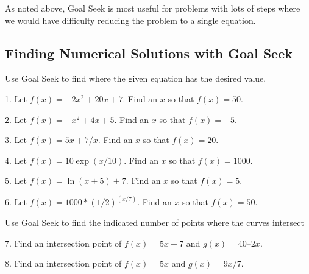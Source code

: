 \documentclass[10pt,]{book}
\theoremstyle{plain}
\theoremstyle{definition}
\theoremstyle{definition}
\begin{document}
%
\par

As noted above, Goal Seek is most useful for problems with lots of steps where we would have difficulty reducing the problem to a single equation.%
\typeout{************************************************}
\typeout{************************************************}
\subsection[{ Finding Numerical Solutions with Goal Seek}]{ Finding Numerical Solutions with Goal Seek}\label{exercises-set-sec-1-6}

Use Goal Seek to find where the given equation has the desired value.%
\begin{exerciselist}
\item[1.]\hypertarget{exercise-75}{} Let \(f(x) = -2 x^2 + 20 x + 7\).  Find an \(x\) so that \(f(x) = 50\).
%
\par\smallskip
\item[2.]\hypertarget{exercise-76}{} Let \(f(x) = -x^2 + 4 x + 5\).  Find an \(x\) so that \(f(x) = -5\).
%
\par\smallskip
\item[3.]\hypertarget{exercise-77}{} Let \(f(x) = 5 x + 7/x\).  Find an \(x\) so that \(f(x) = 20\).
%
\par\smallskip
\item[4.]\hypertarget{exercise-78}{} Let \(f(x) = 10 \exp(x/10)\).  Find an \(x\) so that \(f(x) = 1000\).
%
\par\smallskip
\item[5.]\hypertarget{exercise-79}{} Let \(f(x) = \ln(x+5) + 7\).  Find an \(x\) so that \(f(x) = 5\).
%
\par\smallskip
\item[6.]\hypertarget{exercise-80}{} Let \(f(x) = 1000*(1/2)^{(x/7)}\).  Find an \(x\) so that \(f(x) = 50\).%
\par\smallskip
\par
Use Goal Seek to find the indicated number of points where the curves intersect%
\item[7.]\hypertarget{exercise-81}{} Find an intersection point of \(f(x) = 5 x + 7\) and \(g(x) = 40 – 2 x\).
%
\par\smallskip
\item[8.]\hypertarget{exercise-82}{} Find an intersection point of \(f(x) = 5 x\)  and \(g(x) = 9 x / 7\).
%
\par\smallskip

\end{exerciselist}
\end{document}
